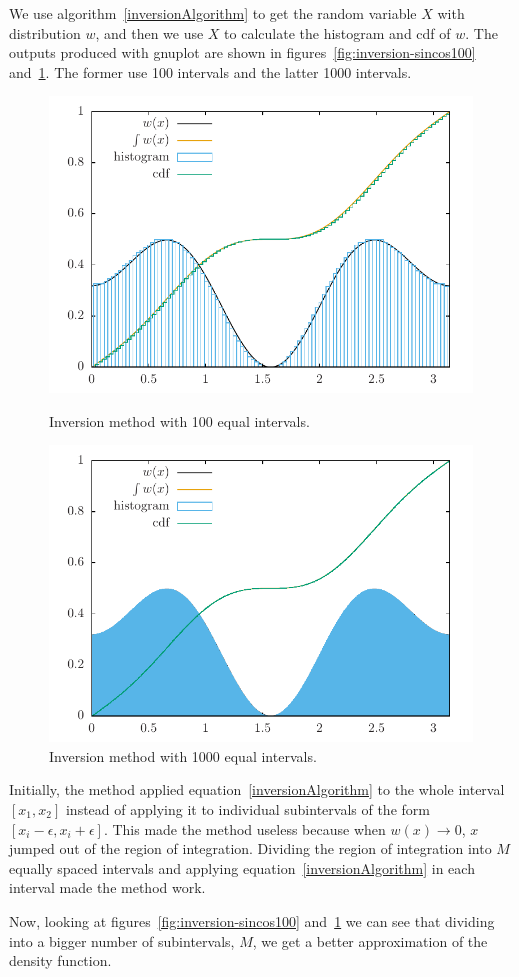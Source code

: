 \documentclass[11pt]{article}
\begin{document}
We use algorithm~\ref{inversionAlgorithm} to get the random variable $X$ with distribution $w$, and then we use $X$ to calculate the histogram and cdf of $w$. The outputs produced with gnuplot are shown in figures~\ref{fig:inversion-sincos100} and~\ref{fig:inversion-sincos1000}. The former use 100 intervals and the latter 1000 intervals.
\begin{figure}[H]
  \centering

  \includegraphics[width=.6\linewidth]{inversion-sincos100}
  \caption{Inversion method with 100 equal intervals.}
\label{fig:inversion-sincos100}

  \includegraphics[width=.6\linewidth]{inversion-sincos1000}
  \caption{Inversion method with 1000 equal intervals.}
\label{fig:inversion-sincos1000}
\end{figure}


Initially, the method applied equation~\ref{inversionAlgorithm} to the whole interval $[x_1,x_2]$ instead of applying it to individual subintervals of the form $[x_i-\epsilon,x_i+\epsilon]$. This made the method useless because when $w(x)\rightarrow 0$, $x$ jumped out of the region of integration. Dividing the region of integration into $M$ equally spaced intervals and applying equation~\ref{inversionAlgorithm} in each interval made the method work.

Now, looking at figures~\ref{fig:inversion-sincos100} and~\ref{fig:inversion-sincos1000} we can see that dividing into a bigger number of subintervals, $M$, we get a better approximation of the density function.
\end{document}

